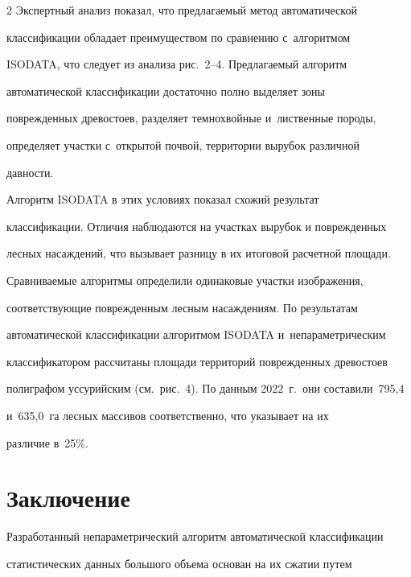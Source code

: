 \begin{multicols}{2}
  Экспертный анализ показал, что пред\-ла\-га\-емый метод автоматической 


классификации обладает преимуществом по сравнению с~алгоритмом 


\mbox{ISODATA}, что следует из анализа рис.~2--4. Пред\-ла\-га\-емый алгоритм 


автоматической классификации достаточно пол\-но выделяет зоны 


по\-вреж\-ден\-ных древостоев, разделяет темнохвойные и~лиственные породы, 


определяет участ\-ки с~открытой почвой, территории вырубок различной 


дав\-ности.








 Алгоритм ISODATA в этих условиях показал схожий результат 


классификации. Отличия наблюдаются на участках вырубок и поврежденных 


лесных насаждений, что вызывает разницу в их итоговой расчетной площади. 





Сравниваемые алгоритмы определили одинаковые участки изображения, 


со\-от\-вет\-ст\-ву\-ющие по\-вреж\-ден\-ным лесным на\-саж\-де\-ни\-ям. По результатам 


автоматической классификации алгоритмом \mbox{ISODATA} и~не\-па\-ра\-мет\-ри\-че\-ским 


классификатором рас\-счи\-та\-ны площади территорий по\-вреж\-ден\-ных древостоев 


полиграфом уссурийским (см.\ рис.~4). По данным 2022~г.\ они со\-ста\-ви\-ли~795,4 


и~635,0~га лесных массивов соответственно, что указывает на их 


различие в~25\%.





\section{Заключение}


  


  Разработанный непараметрический алгоритм автоматической классификации 


статистических данных большого объема основан на их сжатии путем 



\end{multicols}
